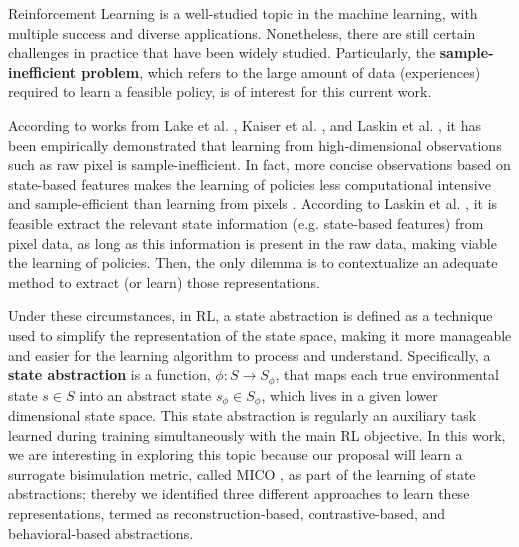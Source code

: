 Reinforcement Learning is a well-studied topic in the machine learning, with multiple success and diverse applications. Nonetheless, there are still certain challenges in practice that have been widely studied. Particularly, the \textbf{sample-inefficient problem}, which refers to the large amount of data (experiences) required to learn a feasible policy, is of interest for this current work. 

According to works from Lake et al. \cite{lake2017building}, Kaiser et al. \cite{kaiser2019model}, and Laskin et al. \cite{laskin2020curl}, it has been empirically demonstrated that learning from high-dimensional observations such as raw pixel is sample-inefficient. In fact, more concise observations based on state-based features makes the learning of policies less computational intensive and sample-efficient than learning from pixels \cite{tassa2018deepmind}. According to Laskin et al. \cite{laskin2020curl}, it is feasible extract the relevant state information (e.g. state-based features) from pixel data, as long as this information is present in the raw data, making viable the learning of policies. Then, the only dilemma is to contextualize an adequate method to extract (or learn) those representations. 


Under these circumstances, in RL, a state abstraction is defined as a technique used to simplify the representation of the state space, making it more manageable and easier for the learning algorithm to process and understand. Specifically, a \textbf{state abstraction} \cite{abel2022theory} is a function, $\phi : S \rightarrow S_\phi$, that maps each true environmental state $s \in S$ into an abstract state $s_\phi \in S_\phi$, which lives in a given lower dimensional state space. This state abstraction is regularly an auxiliary task learned during training simultaneously with the main RL objective. In this work, we are interesting in exploring this topic because our proposal will learn a surrogate bisimulation metric, called MICO \cite{castro2021mico}, as part of the learning of state abstractions; thereby we identified three different approaches to learn these representations, termed as reconstruction-based, contrastive-based, and behavioral-based abstractions.


